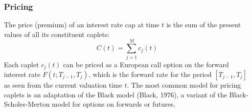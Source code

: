 \documentclass[11pt, a4paper, british]{article}
\begin{document}
\newpage

\subsubsection{Pricing}
The price (premium) of an interest rate cap at time $t$ is the sum of the present values of all its constituent caplets:
\begin{equation}
 C(t) = \sum_{j=1}^{M} c_j(t)
 \label{eq:cap_price_sum_caplets}
\end{equation}
Each caplet $c_j(t)$ can be priced as a European call option on the forward interest rate $F(t; T_{j-1}, T_j)$, which is the forward rate for the period $[T_{j-1}, T_j]$ as seen from the current valuation time $t$. The most common model for pricing caplets is an adaptation of the Black model (Black, 1976), a variant of the Black-Scholes-Merton model for options on forwards or futures.
\end{document}
